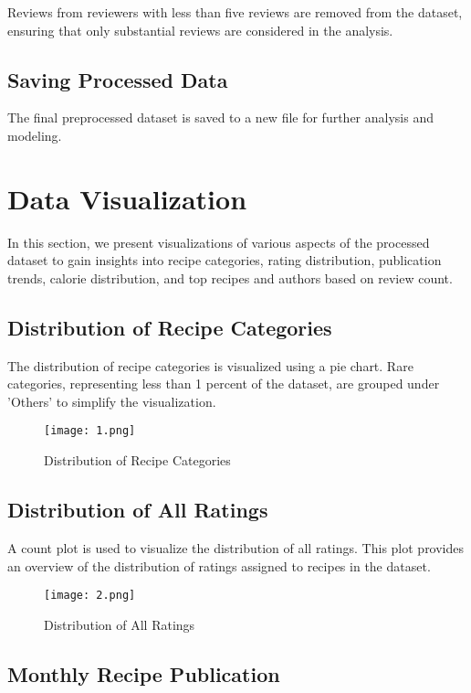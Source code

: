 \documentclass[conference]{IEEEtran}
\begin{document}
Reviews from reviewers with less than five reviews are removed from the dataset, ensuring that only substantial reviews are considered in the analysis.

\subsection{Saving Processed Data}

The final preprocessed dataset is saved to a new file for further analysis and modeling.

\section{Data Visualization}

In this section, we present visualizations of various aspects of the processed dataset to gain insights into recipe categories, rating distribution, publication trends, calorie distribution, and top recipes and authors based on review count.

\subsection{Distribution of Recipe Categories}

The distribution of recipe categories is visualized using a pie chart. Rare categories, representing less than 1 percent of the dataset, are grouped under 'Others' to simplify the visualization.

\begin{figure}[H]
\centering
\texttt{[image: 1.png]}
\caption{Distribution of Recipe Categories}
\label{fig:distribution_categories}
\end{figure}

\subsection{Distribution of All Ratings}

A count plot is used to visualize the distribution of all ratings. This plot provides an overview of the distribution of ratings assigned to recipes in the dataset.

\begin{figure}[H]
\centering
\texttt{[image: 2.png]}
\caption{Distribution of All Ratings}
\label{fig:distribution_ratings}
\end{figure}


\subsection{Monthly Recipe Publication}
\end{document}

